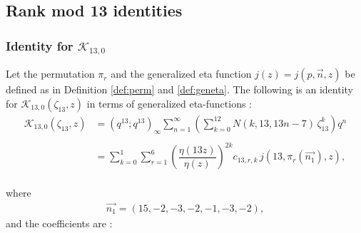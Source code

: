 \documentclass[12pt]{amsart}
\theoremstyle{definition}
\theoremstyle{remark}
\numberwithin{equation}{section}
\newcommand\Lpar[1]{\left(#1\right)}
\newcommand\refdef[1]{\ref{def:#1}}
\begin{document}
\subsection{Rank mod 13 identities}
\label{subsec:mod13}

\subsubsection{\textbf{Identity for $\mathcal{K}_{13,0}$}}


Let the permutation $\pi_r$ and the generalized eta function $j(z)=j(p,\overrightarrow{n},z)$ be defined as in Definition \refdef{perm} and \refdef{geneta}. The following is an identity for $\mathcal{K}_{13,0}(\zeta_{13},z)$ in terms of generalized eta-functions :
\\
\begin{align}
\mathcal{K}_{13,0}(\zeta_{13},z)&=(q^{13};q^{13})_\infty \sum_{n=1}^\infty \Lpar{\sum_{k=0}^{12} N(k,13,13n-7)\,\zeta_{13}^k}q^n \label{eq:rank13id1} \\
\nonumber
\\
&=\sum_{k=0}^{1}\sum_{r=1}^{6} \left(\dfrac{\eta(13z)}{\eta(z)}\right)^{2k}c_{13,r,k}\,j(13,\pi_r(\overrightarrow{n_1}),z),
\nonumber
\end{align}
\\
where 
\begin{align*}
\overrightarrow{n_1}=(15,-2,-3,-2,-1,-3,-2),
\end{align*}
and the coefficients are :
\end{document}
